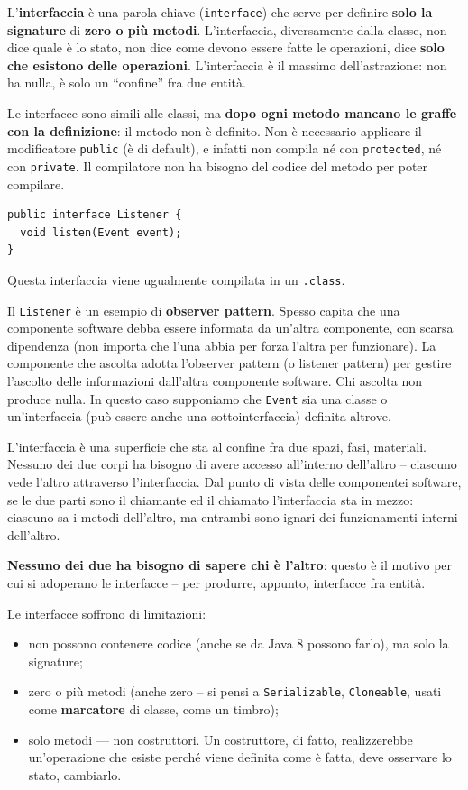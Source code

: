 \documentclass[\fontsizeclass,twocolumn]{\classname}
\theoremstyle{definition}
\theoremstyle{definition}
\begin{document}
L'\textbf{interfaccia} è una parola chiave (\texttt{interface}) che serve per
definire \textbf{solo la signature} di \textbf{zero o più metodi}.
L'interfaccia, diversamente dalla classe, non dice quale è lo stato, non dice
come devono essere fatte le operazioni, dice \textbf{solo che esistono delle
operazioni}. L'interfaccia è il massimo dell'astrazione: non ha nulla, è solo
un ``confine'' fra due entità.

Le interfacce sono simili alle classi, ma \textbf{dopo ogni metodo mancano le
graffe con la definizione}: il metodo non è definito. Non è necessario
applicare il modificatore \texttt{public} (è di default), e infatti non compila
né con \texttt{protected}, né con \texttt{private}. Il compilatore non ha
bisogno del codice del metodo per poter compilare.

\begin{lstlisting}
public interface Listener {
  void listen(Event event);
}
\end{lstlisting}

Questa interfaccia viene ugualmente compilata in un \texttt{.class}.

Il \texttt{Listener} è un esempio di \textbf{observer pattern}. Spesso capita
che una componente software debba essere informata da un'altra componente, con
scarsa dipendenza (non importa che l'una abbia per forza l'altra per
funzionare). La componente che ascolta adotta l'observer pattern (o listener
pattern) per gestire l'ascolto delle informazioni dall'altra componente
software. Chi ascolta non produce nulla. In questo caso supponiamo che
\texttt{Event} sia una classe o un'interfaccia (può essere anche una
sottointerfaccia) definita altrove.

L'interfaccia è una superficie che sta al confine fra due spazi, fasi,
materiali. Nessuno dei due corpi ha bisogno di avere accesso all'interno
dell'altro -- ciascuno vede l'altro attraverso l'interfaccia. Dal punto di
vista delle componentei software, se le due parti sono il chiamante ed il
chiamato l'interfaccia sta in mezzo: ciascuno sa i metodi dell'altro, ma
entrambi sono ignari dei funzionamenti interni dell'altro.

\textbf{Nessuno dei due ha bisogno di sapere chi è l'altro}: questo è il motivo
per cui si adoperano le interfacce -- per produrre, appunto, interfacce fra
entità.

Le interfacce soffrono di limitazioni:
\begin{itemize}
    \item non possono contenere codice (anche se da Java 8 possono farlo), ma
        solo la signature;
    \item zero o più metodi (anche zero -- si pensi a \texttt{Serializable},
        \texttt{Cloneable}, usati come \textbf{marcatore} di classe, come un
        timbro);
    \item solo metodi --- non costruttori. Un costruttore, di fatto,
        realizzerebbe un'operazione che esiste perché viene definita come è
        fatta, deve osservare lo stato, cambiarlo.
\end{itemize}
\end{document}
